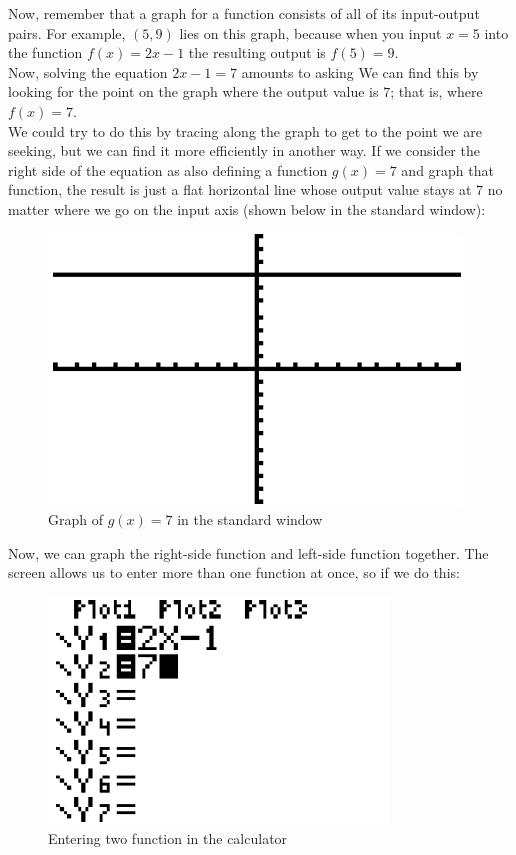 Now, remember that a graph for a function consists of all of its input-output pairs. For example, $(5,9)$ lies on this graph, because when you input $x=5$ into the function $f(x)=2x-1$ the resulting output is $f(5)=9$.\\

Now, solving the equation $2x-1=7$ amounts to asking  We can find this by looking for the point on the graph where the output value is $7$; that is, where $f(x)=7$.\\

We could try to do this by tracing along the graph to get to the point we are seeking, but we can find it more efficiently in another way. If we consider the right side of the equation as also defining a function $g(x)=7$ and graph that function, the result is just a flat horizontal line whose output value stays at $7$ no matter where we go on the input axis (shown below in the standard window):

\begin{figure}[H]
	\centering
	\includegraphics[scale=1.0]{Sections/SolvingEquationsGraphically/Figure02.png}
	\caption{Graph of $g(x)=7$ in the standard window}
\end{figure}

Now, we can graph the right-side function and left-side function together. The  screen allows us to enter more than one function at once, so if we do this:

\begin{figure}[H]
	\centering
	\includegraphics[scale=1.0]{Sections/SolvingEquationsGraphically/Figure03.png}
	\caption{Entering two function in the calculator}
\end{figure}

